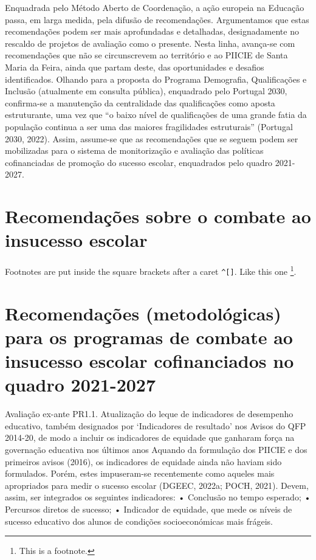 \documentclass[
]{book}
\begin{document}
Enquadrada pelo Método Aberto de Coordenação, a ação europeia na Educação passa, em larga medida, pela difusão de recomendações. Argumentamos que estas recomendações podem ser mais aprofundadas e detalhadas, designadamente no rescaldo de projetos de avaliação como o presente. Nesta linha, avança-se com recomendações que não se circunscrevem ao território e ao PIICIE de Santa Maria da Feira, ainda que partam deste, das oportunidades e desafios identificados.
Olhando para a proposta do Programa Demografia, Qualificações e Inclusão (atualmente em consulta pública), enquadrado pelo Portugal 2030, confirma-se a manutenção da centralidade das qualificações como aposta estruturante, uma vez que ``o baixo nível de qualificações de uma grande fatia da população continua a ser uma das maiores fragilidades estruturais'' (Portugal 2030, 2022). Assim, assume-se que as recomendações que se seguem podem ser mobilizadas para o sistema de monitorização e avaliação das políticas cofinanciadas de promoção do sucesso escolar, enquadrados pelo quadro 2021-2027.

\hypertarget{recomendauxe7uxf5es-sobre-o-combate-ao-insucesso-escolar-1}{%
\section{Recomendações sobre o combate ao insucesso escolar}\label{recomendauxe7uxf5es-sobre-o-combate-ao-insucesso-escolar-1}}

Footnotes are put inside the square brackets after a caret \texttt{\^{}{[}{]}}. Like this one \footnote{This is a footnote.}.

\hypertarget{recomendauxe7uxf5es-metodoluxf3gicas-para-os-programas-de-combate-ao-insucesso-escolar-cofinanciados-no-quadro-2021-2027-1}{%
\section{Recomendações (metodológicas) para os programas de combate ao insucesso escolar cofinanciados no quadro 2021-2027}\label{recomendauxe7uxf5es-metodoluxf3gicas-para-os-programas-de-combate-ao-insucesso-escolar-cofinanciados-no-quadro-2021-2027-1}}

Avaliação ex-ante
PR1.1. Atualização do leque de indicadores de desempenho educativo, também designados por `Indicadores de resultado' nos Avisos do QFP 2014-20, de modo a incluir os indicadores de equidade que ganharam força na governação educativa nos últimos anos
Aquando da formulação dos PIICIE e dos primeiros avisos (2016), os indicadores de equidade ainda não haviam sido formulados. Porém, estes impuseram-se recentemente como aqueles mais apropriados para medir o sucesso escolar (DGEEC, 2022a; POCH, 2021). Devem, assim, ser integrados os seguintes indicadores:
• Conclusão no tempo esperado;
• Percursos diretos de sucesso;
• Indicador de equidade, que mede os níveis de sucesso educativo dos alunos de condições socioeconómicas mais frágeis.
\end{document}
